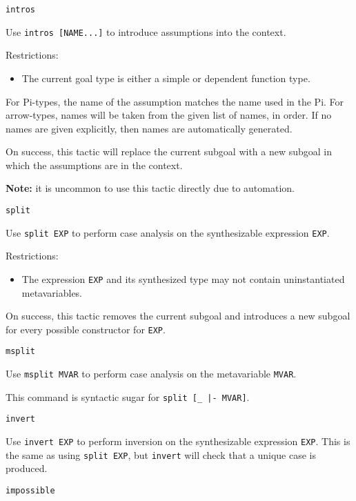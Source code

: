 \begin{description}
\item{\texttt{intros}}

Use \texttt{intros [NAME...]} to introduce assumptions into the context.

Restrictions:
\begin{itemize}
\item The current goal type is either a simple or dependent function type.
\end{itemize}

For Pi-types, the name of the assumption matches the name used in the Pi. For
arrow-types, names will be taken from the given list of names, in order. If no
names are given explicitly, then names are automatically generated.

On success, this tactic will replace the current subgoal with a new subgoal in
which the assumptions are in the context.

\textbf{Note:} it is uncommon to use this tactic directly due to automation.

\item{\texttt{split}}

Use \texttt{split EXP} to perform case analysis on the synthesizable expression \texttt{EXP}.

Restrictions:
\begin{itemize}
\item The expression \texttt{EXP} and its synthesized type may not contain
  uninstantiated metavariables.
\end{itemize}

On success, this tactic removes the current subgoal and introduces a new subgoal
for every possible constructor for \texttt{EXP}.

\item{\texttt{msplit}}

Use \texttt{msplit MVAR} to perform case analysis on the metavariable \texttt{MVAR}.

This command is syntactic sugar for \texttt{split [_ |- MVAR]}.

\item{\texttt{invert}}

Use \texttt{invert EXP} to perform inversion on the synthesizable expression
\texttt{EXP}.
This is the same as using \texttt{split EXP}, but \texttt{invert} will check that a unique
case is produced.

\item{\texttt{impossible}}


\end{description}
